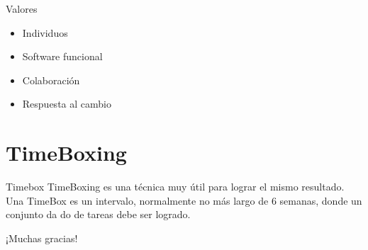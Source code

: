 \documentclass[usenames,dvipsnames]{beamer}
\begin{document}
\begin{frame}{Valores}
    \begin{itemize}
        \item Individuos
        \item Software funcional
        \item Colaboración
        \item Respuesta al cambio
    \end{itemize}
\end{frame}{}



\section{TimeBoxing}

\begin{frame}{Timebox}
    TimeBoxing es una técnica muy útil para lograr el mismo resultado. Una TimeBox es un intervalo, normalmente no más largo de 6 semanas, donde un conjunto da do de tareas debe ser logrado.
\end{frame}{}


\begin{frame}[standout]
  ¡Muchas gracias!
\end{frame}
\end{document}
